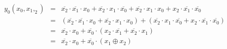 \documentclass[DIN, pagenumber=false, fontsize=11pt, parskip=half]{scrartcl}
\begin{document}
\begin{enumerate}[label=(\alph*)]
\begin{eqnarray*}
                y_0(x_0, x_1, _2) &=& 
                \overline{x_2} \cdot \overline{x_1} \cdot x_0 + 
                \overline{x_2} \cdot x_1 \cdot \overline{x_0} +
                \overline{x_2} \cdot x_1 \cdot x_0 +
                x_2 \cdot \overline{x_1} \cdot \overline{x_0} \\
                &=& (\overline{x_2} \cdot \overline{x_1} \cdot x_0 + 
                \overline{x_2} \cdot x_1 \cdot x_0) +
                (\overline{x_2} \cdot x_1 \cdot \overline{x_0} +
                x_2 \cdot \overline{x_1} \cdot \overline{x_0}) \\
                &=& \overline{x_2} \cdot x_0 +
                \overline{x_0} \cdot (x_2 \cdot \overline{x_1} + \overline{x_2} \cdot x_1) \\
                &=& \overline{x_2} \cdot x_0 + \overline{x_0} \cdot (x_1 \oplus x_2)
            \end{eqnarray*}
    \end{enumerate}
\end{document}

